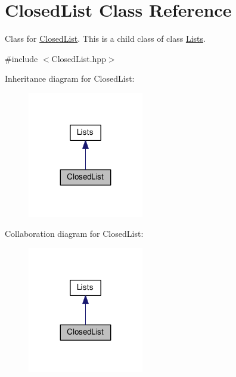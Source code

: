 \hypertarget{classClosedList}{}\section{Closed\+List Class Reference}
\label{classClosedList}


Class for \hyperlink{classClosedList}{Closed\+List}. This is a child class of class \hyperlink{classLists}{Lists}.  




{\ttfamily \#include $<$Closed\+List.\+hpp$>$}



Inheritance diagram for Closed\+List\+:
\nopagebreak
\begin{figure}[H]
\begin{center}
\leavevmode
\includegraphics[width=143pt]{classClosedList__inherit__graph}
\end{center}
\end{figure}


Collaboration diagram for Closed\+List\+:
\nopagebreak
\begin{figure}[H]
\begin{center}
\leavevmode
\includegraphics[width=143pt]{classClosedList__coll__graph}
\end{center}
\end{figure}
